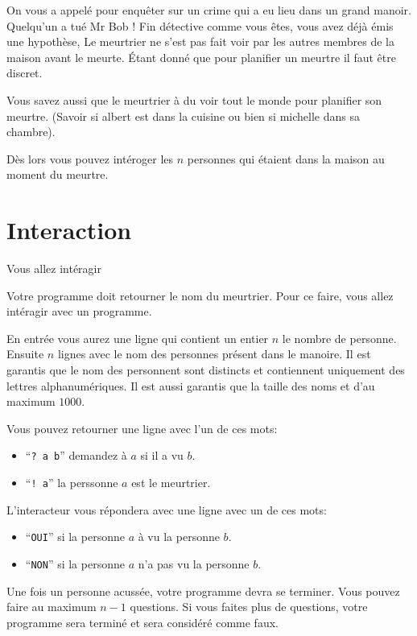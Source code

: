 \problemname{\problemyamlname}


\newcommand{\maxn}{10e4}  %

On vous a appelé pour enquêter sur un crime qui a eu lieu dans un grand manoir. Quelqu'un a tué Mr Bob ! Fin détective comme vous êtes, vous avez déjà émis une hypothèse,
Le meurtrier ne s'est pas fait voir par les autres membres de la maison avant le meurte. Étant donné que pour planifier un meurtre il faut être discret.

Vous savez aussi que le meurtrier à du voir tout le monde pour planifier son meurtre. (Savoir si albert est dans la cuisine ou bien si michelle dans sa chambre).

Dès lors vous pouvez intéroger les $n$ personnes qui étaient dans la maison au moment du meurtre. 


\section*{Interaction}
Vous allez intéragir 

Votre programme doit retourner le nom du meurtrier. Pour ce faire, vous allez intéragir avec un programme.

En entrée vous aurez une ligne qui contient un entier $n$ le nombre de personne.
Ensuite $n$ lignes avec le nom des personnes présent dans le manoire. Il est garantis que le nom des personnent sont distincts et contiennent uniquement des lettres alphanumériques.
Il est aussi garantis que la taille des noms et d'au maximum $1000$.

Vous pouvez retourner une ligne avec l'un de ces mots:

\begin{itemize}
    \item ``\texttt{? a b}'' demandez à $a$ si il a vu $b$.
    \item ``\texttt{! a}'' la perssonne $a$ est le meurtrier.
\end{itemize}

L'interacteur vous répondera avec une ligne avec un de ces mots:
\begin{itemize}
    \item ``\texttt{OUI}'' si la personne $a$ à vu la personne $b$.
    \item ``\texttt{NON}'' si la personne $a$ n'a pas vu la personne $b$.
\end{itemize}

Une fois un personne acussée, votre programme devra se terminer.
Vous pouvez faire au maximum $n - 1$ questions. Si vous faites plus de questions, votre programme sera terminé et sera considéré comme faux. 
